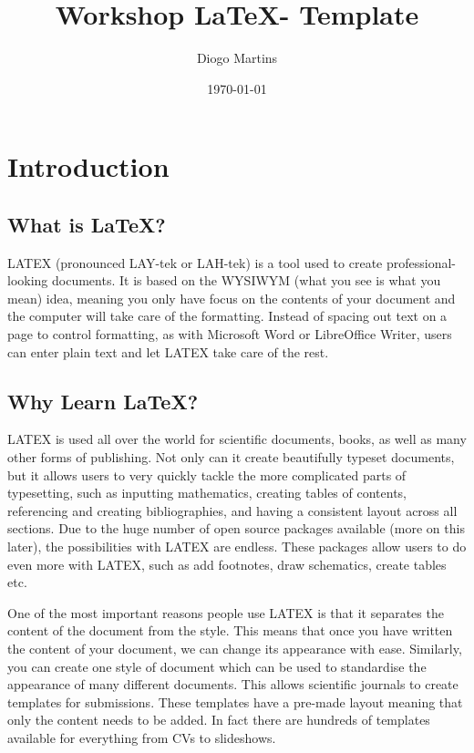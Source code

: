 \documentclass{article}
\title{Workshop \LaTeX - Template} %
\author{Diogo Martins} %
\date{\today} %
\begin{document}
\maketitle %

\tableofcontents %
\newpage %

\section{Introduction}

\subsection{What is \LaTeX?}
LATEX (pronounced LAY-tek or LAH-tek) is a tool used to create professional-looking  documents. It is based on the WYSIWYM (what you see is what you mean) idea, meaning you only have focus on the contents of your document and the computer will take care of the formatting. Instead of spacing out text on a page to control formatting, as with Microsoft Word or LibreOffice Writer, users can enter plain text and let LATEX take care of the rest.


\subsection{Why Learn \LaTeX?}
LATEX is used all over the world for scientific documents, books, as well as many other forms of publishing. Not only can it create beautifully typeset documents, but it allows users to very quickly tackle the more complicated parts of typesetting, such as inputting mathematics, creating tables of contents, referencing and creating bibliographies, and having a consistent layout across all sections. Due to the huge number of open source packages available (more on this later), the possibilities with LATEX are endless. These packages allow users to do even more with LATEX, such as add footnotes, draw schematics, create tables etc.

One of the most important reasons people use LATEX is that it separates the content of the document from the style. This means that once you have written the content of your document, we can change its appearance with ease. Similarly, you can create one style of document which can be used to standardise the appearance of many different documents. This allows scientific journals to create templates for submissions. These templates have a pre-made layout meaning that only the content needs to be added. In fact there are hundreds of templates available for everything from CVs to slideshows.
\end{document}
